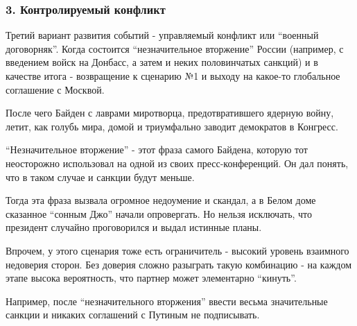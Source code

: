  
 
 
 
 

\subsubsection{3. Контролируемый конфликт}

Третий вариант развития событий - управляемый конфликт или \enquote{военный
договорняк}. Когда состоится \enquote{незначительное вторжение} России (например, с
введением войск на Донбасс, а затем и неких половинчатых санкций) и в качестве
итога - возвращение к сценарию №1 и выходу на какое-то глобальное соглашение с
Москвой.

После чего Байден с лаврами миротворца, предотвратившего ядерную войну, летит,
как голубь мира, домой и триумфально заводит демократов в Конгресс.

\enquote{Незначительное вторжение} - этот фраза самого Байдена, которую тот
неосторожно использовал на одной из своих пресс-конференций. Он дал понять, что
в таком случае и санкции будут меньше. 

Тогда эта фраза вызвала огромное недоумение и скандал, а в Белом доме сказанное
\enquote{сонным Джо} начали опровергать. Но нельзя исключать, что президент
случайно проговорился и выдал истинные планы. 

Впрочем, у этого сценария тоже есть ограничитель - высокий уровень взаимного
недоверия сторон. Без доверия сложно разыграть такую комбинацию - на каждом
этапе высока вероятность, что партнер может элементарно \enquote{кинуть}. 

Например, после \enquote{незначительного вторжения} ввести весьма значительные
санкции и никаких соглашений с Путиным не подписывать. 
